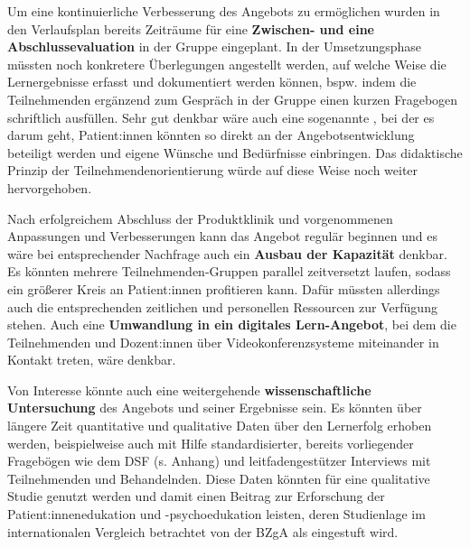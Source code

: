 \documentclass[
  twoside,
  parskip=half-,
]{scrreprt}
\begin{document}
Um eine kontinuierliche Verbesserung des Angebots zu ermöglichen wurden in den Verlaufsplan bereits Zeiträume für eine \textbf{Zwischen- und eine Abschlussevaluation} in der Gruppe eingeplant. In der Umsetzungsphase müssten noch konkretere Überlegungen angestellt werden, auf welche Weise die Lernergebnisse erfasst und dokumentiert werden können, bspw. indem die Teilnehmenden ergänzend zum Gespräch in der Gruppe einen kurzen Fragebogen schriftlich ausfüllen. Sehr gut denkbar wäre auch eine sogenannte \textbf{}, bei der es darum geht,  Patient:innen könnten so direkt an der Angebotsentwicklung beteiligt werden und eigene Wünsche und Bedürfnisse einbringen. Das didaktische Prinzip der Teilnehmendenorientierung würde auf diese Weise noch weiter hervorgehoben.

Nach erfolgreichem Abschluss der Produktklinik und vorgenommenen Anpassungen und Verbesserungen kann das Angebot regulär beginnen und es wäre bei entsprechender Nachfrage auch ein \textbf{Ausbau der Kapazität} denkbar. Es könnten mehrere Teilnehmenden-Gruppen parallel zeitversetzt laufen, sodass ein größerer Kreis an Patient:innen profitieren kann. Dafür müssten allerdings auch die entsprechenden zeitlichen und personellen Ressourcen zur Verfügung stehen. Auch eine \textbf{Umwandlung in ein digitales Lern-Angebot}, bei dem die Teilnehmenden und Dozent:innen über Videokonferenzsysteme miteinander in Kontakt treten, wäre denkbar.

Von Interesse könnte auch eine weitergehende \textbf{wissenschaftliche Untersuchung} des Angebots und seiner Ergebnisse sein. Es könnten über längere Zeit quantitative und qualitative Daten über den Lernerfolg erhoben werden, beispielweise auch mit Hilfe standardisierter, bereits vorliegender Fragebögen wie dem DSF (s. Anhang) und leitfadengestützer Interviews mit Teilnehmenden und Behandelnden. Diese Daten könnten für eine qualitative Studie genutzt werden und damit einen Beitrag zur Erforschung der Patient:innenedukation und -psychoedukation leisten, deren Studienlage im internationalen Vergleich betrachtet von der BZgA als  eingestuft wird.
\end{document}

